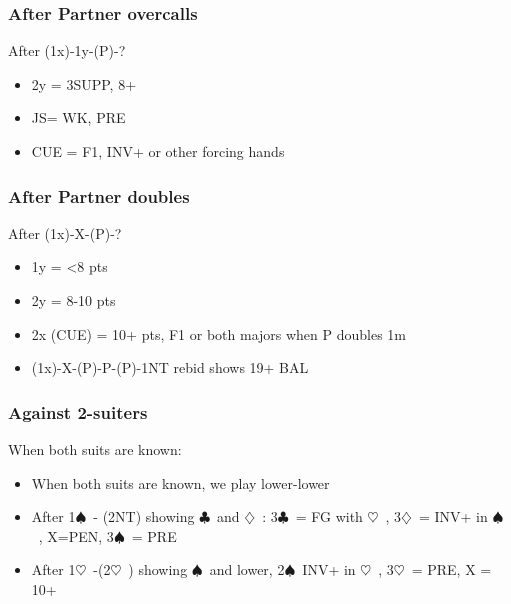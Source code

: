 \documentclass{article}
\newcommand\C{\ensuremath{\clubsuit}}
\newcommand\D{\ensuremath{\diamondsuit}}
\renewcommand\H{\ensuremath{\heartsuit}}
\renewcommand\S{\ensuremath{\spadesuit}}
\begin{document}
\begin{multicols}{2}
  \subsubsection{After Partner overcalls}
  After (1x)-1y-(P)-?
  \begin{itemize}
    \item 2y = 3SUPP, 8+
     \item JS= WK, PRE
     \item CUE = F1, INV+ or other forcing hands
  \end{itemize}
  \subsubsection{After Partner doubles}
  After (1x)-X-(P)-?
  \begin{itemize}
    \item 1y = <8 pts
    \item 2y = 8-10 pts
    \item 2x (CUE) = 10+ pts, F1 or both majors when P doubles 1m
     \item (1x)-X-(P)-P-(P)-1NT rebid shows 19+ BAL
  \end{itemize}
  \subsubsection{Against 2-suiters}
  \label{twosdefence}
  When both suits are known:
  \begin{itemize}
    \item When both suits are known, we play lower-lower
    \item After 1\S\ - (2NT) showing \C\ and \D\ : 3\C\ = FG with \H\ , 3\D\ = INV+ in \S\ , X=PEN, 3\S\ = PRE
    \item After 1\H\ -(2\H\ ) showing \S\ and lower, 2\S\ INV+ in \H\ , 3\H\ = PRE, X = 10+ 
    \end{itemize}
\end{multicols}
\end{document}
